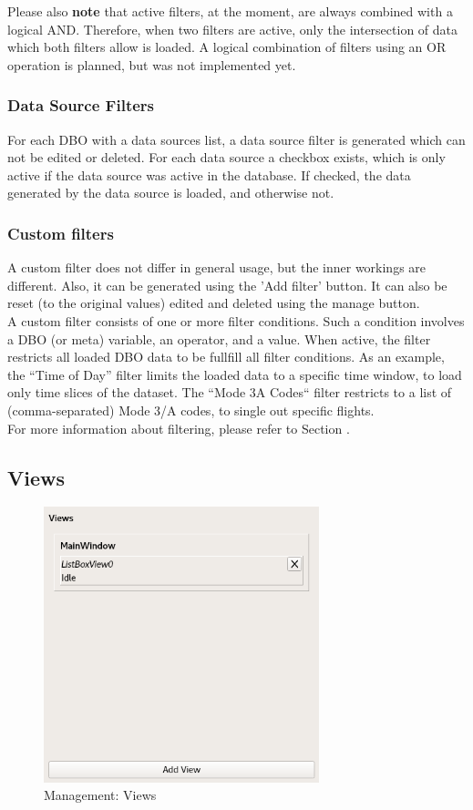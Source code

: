 Please also \textbf{note} that active filters, at the moment, are always combined with a logical AND. Therefore,
when  two  filters  are  active,  only  the  intersection  of  data  which  both  filters  allow  is  loaded.   A  logical combination of filters using an OR operation is planned, but was not implemented yet.

\subsubsection{Data Source Filters}
For each DBO with a data sources list, a data source filter is generated which can not be edited or deleted.  For each
data source a checkbox exists, which is only active if the data source was active in the database. If checked, the
data generated by the data source is loaded, and otherwise not.

\subsubsection{Custom filters}
A  custom  filter  does  not  differ  in  general  usage,  but  the  inner  workings  are  different.   Also,  it  can  be generated using the 'Add filter' button. It can also be reset (to the original values) edited and deleted using
the manage button. \\
A custom filter consists of one or more filter conditions.  Such a condition involves a DBO (or meta) variable, an operator, and a value.  When active, the filter restricts all loaded DBO data to be fullfill all filter conditions.
As an example, the ``Time of Day'' filter limits the loaded data to a specific time window, to load only time slices of the dataset.  The ``Mode 3A Codes`` filter restricts to a list of (comma-separated) Mode 3/A codes, to single out specific flights. \\

For more information about filtering, please refer to Section .

\subsection{Views}

\begin{figure}[H]
  \center
    \includegraphics[width=8cm,frame]{../screenshots/management_views.png}
  \caption{Management: Views}
  \label{fig:management_views}
\end{figure}

